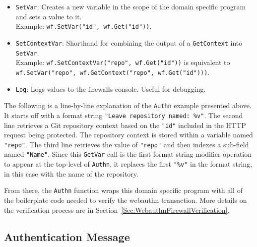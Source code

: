 \begin{itemize}[nosep]
\item \lstinline{SetVar}: Creates a new variable in the scope of the domain specific program and sets a value to it. \\Example: \lstinline{wf.SetVar("id", wf.Get("id"))}.

\item \lstinline{SetContextVar}: Shorthand for combining the output of a \lstinline{GetContext} into \lstinline{SetVar}. \\Example: \lstinline{wf.SetContextVar("repo", wf.Get("id"))} is equivalent to \\ \lstinline{wf.SetVar("repo", wf.GetContext("repo", wf.Get("id")))}.

\item \lstinline{Log}: Logs values to the firewalls console. Useful for debugging. 

\end{itemize}

\noindent The following is a line-by-line explanation of the \lstinline{Authn} example presented above. It starts off with a format string \lstinline{"Leave repository named: %v"}. The second line retrieves a Git repository context based on the \lstinline{"id"} included in the HTTP request being protected. The repository context is stored within a variable named \lstinline{"repo"}. The third line retrieves the value of \lstinline{"repo"} and then indexes a sub-field named \lstinline{"Name"}. Since this \lstinline{GetVar} call is the first format string modifier operation to appear at the top-level of \lstinline{Authn}, it replaces the first \lstinline{"%v"} in the format string, in this case with the name of the repository.

From there, the \lstinline{Authn} function wraps this domain specific program with all of the boilerplate code needed to verify the webauthn transaction. More details on the verification process are in Section~\ref{Sec:WebauthnFirewallVerification}.

\iffalse
 It happens to be a structure, so the name of the repository is  
. It indexes further into the struct to get the

affects the format string

\fi

\subsection{Authentication Message}\label{Sec:AuthenticationMessage}

